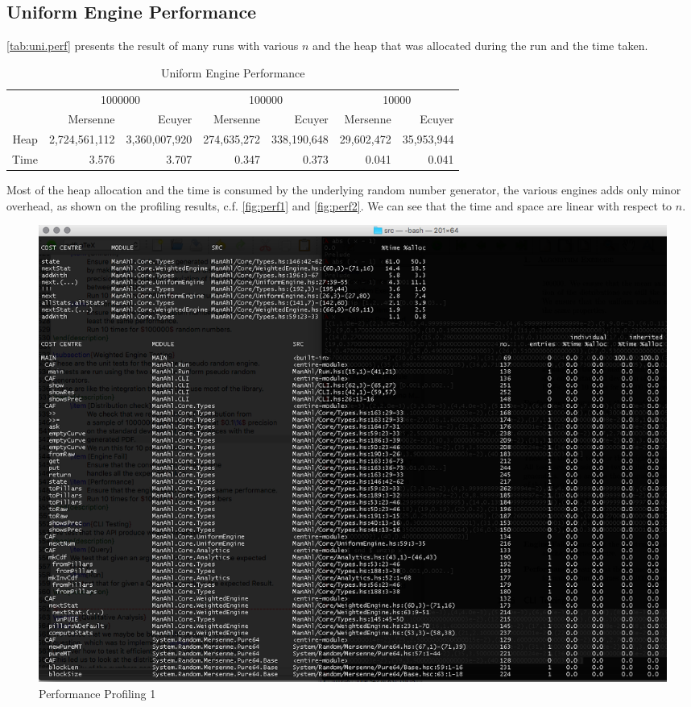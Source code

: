 \documentclass[12pt,a4paper,article]{memoir} %
\begin{document}
\subsection{Uniform Engine Performance}
\autoref{tab:uni.perf} presents the result of many runs with various $n$ and
the heap that was allocated during the run and the time taken.
\begin{table}[htbp!]
  \centering \tiny
    \begin{tabular}{r|rrrrrr}
    \multicolumn{1}{r}{} & \multicolumn{2}{c}{1000000} & \multicolumn{2}{c}{100000} & \multicolumn{2}{c}{10000} \\
    \multicolumn{1}{r}{} & Mersenne & Ecuyer & Mersenne & Ecuyer & Mersenne & Ecuyer \\
\cmidrule{2-7}    Heap  & 2,724,561,112 & 3,360,007,920 & 274,635,272 & 338,190,648 & 29,602,472 & 35,953,944 \\
    Time  & 3.576 & 3.707 & 0.347 & 0.373 & 0.041 & 0.041 \\
    \end{tabular}%
  \caption{Uniform Engine Performance}
  \label{tab:uni.perf}%
\end{table}%
Most of the heap allocation and the time is consumed by the underlying 
random number generator, the various engines adds only minor overhead, 
as shown on the profiling results, c.f. \autoref{fig:perf1} and \autoref{fig:perf2}.
We can see that the time and space are linear with respect to $n$. 
\begin{figure}[h!]
\begin{center}
\includegraphics[width=1\textwidth]{img/prof1.png}
\caption{Performance Profiling 1}
\label{fig:perf1}
\end{center}
\end{figure}
\end{document}

